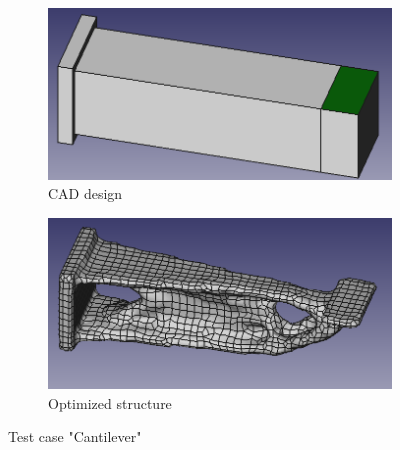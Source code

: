 \begin{figure}[H]
\begin{subfigure}[t]{.45\textwidth}
\begin{center}
\includegraphics[width=.9\textwidth]{Pictures/Results/CantiIn.png}
\end{center}
\caption{CAD design}
\label{fig:cantiCAD}
\end{subfigure}
\begin{subfigure}[t]{.45\textwidth}
\begin{center}
\includegraphics[width=.9\textwidth]{Pictures/Results/CantiOut.png}
\end{center}
\caption{Optimized structure}
\label{fig:cantiOPTIM}
\end{subfigure}
\caption{Test case "Cantilever"}
\end{figure}

